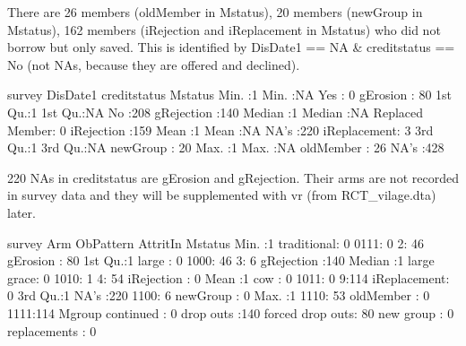 There are 26 members (\textsf{oldMember} in \textsf{Mstatus}), 
20 members (\textsf{newGroup} in \textsf{Mstatus}),
162 members (\textsf{iRejection} and \textsf{iReplacement} in \textsf{Mstatus})
who did not borrow but only saved. This is identified by \textsf{DisDate1} == NA \& \textsf{creditstatus} == No (not NAs, because they are offered and declined). 
\begin{Schunk}
\begin{Soutput}
     survey     DisDate1            creditstatus         Mstatus   
 Min.   :1   Min.   :NA    Yes            :  0   gErosion    : 80  
 1st Qu.:1   1st Qu.:NA    No             :208   gRejection  :140  
 Median :1   Median :NA    Replaced Member:  0   iRejection  :159  
 Mean   :1   Mean   :NA    NA's           :220   iReplacement:  3  
 3rd Qu.:1   3rd Qu.:NA                          newGroup    : 20  
 Max.   :1   Max.   :NA                          oldMember   : 26  
             NA's   :428                                           
\end{Soutput}
\end{Schunk}
220 NAs in \textsf{creditstatus} are \textsf{gErosion} and \textsf{gRejection}. Their arms are not recorded in survey data and they will be supplemented with \textsf{vr} (from \textsf{RCT\_vilage.dta}) later.
\begin{Schunk}
\begin{Soutput}
     survey           Arm      ObPattern  AttritIn         Mstatus   
 Min.   :1   traditional:  0   0111:  0   2: 46    gErosion    : 80  
 1st Qu.:1   large      :  0   1000: 46   3:  6    gRejection  :140  
 Median :1   large grace:  0   1010:  1   4: 54    iRejection  :  0  
 Mean   :1   cow        :  0   1011:  0   9:114    iReplacement:  0  
 3rd Qu.:1   NA's       :220   1100:  6            newGroup    :  0  
 Max.   :1                     1110: 53            oldMember   :  0  
                               1111:114                              
              Mgroup   
 continued       :  0  
 drop outs       :140  
 forced drop outs: 80  
 new group       :  0  
 replacements    :  0  
                       
                       
\end{Soutput}
\end{Schunk}


